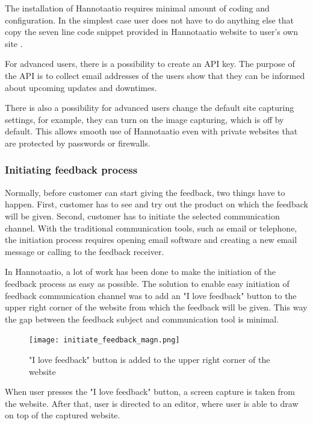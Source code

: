 \documentclass[english,12pt,a4paper,pdftex]{article}
\begin{document}
The installation of Hannotaatio requires minimal amount of coding and configuration. In the simplest case user does not have to do anything else that copy the seven line code snippet provided in Hannotaatio website to user's own site \citep{hannotaatio}.

For advanced users, there is a possibility to create an \ac{API} key. The purpose of the \ac{API} is to collect email addresses of the users show that they can be informed about upcoming updates and downtimes.

There is also a possibility for advanced users change the default site capturing settings, for example, they can turn on the image capturing, which is off by default. This allows smooth use of Hannotaatio even with private websites that are protected by passwords or firewalls.

\subsubsection{Initiating feedback process}

Normally, before customer can start giving the feedback, two things have to happen. First, customer has to see and try out the product on which the feedback will be given. Second, customer has to initiate the selected communication channel. With the traditional communication tools, such as email or telephone, the initiation process requires opening email software and creating a new email message or calling to the feedback receiver.

In Hannotaatio, a lot of work has been done to make the initiation of the feedback process as easy as possible. The solution to enable easy initiation of feedback communication channel was to add an "I love feedback" button to the upper right corner of the website from which the feedback will be given. This way the gap between the feedback subject and communication tool is minimal.

\begin{figure}[htb]
\begin{center}
\texttt{[image: initiate\_feedback\_magn.png]}
\end{center}
\caption{"I love feedback" button is added to the upper right corner of the website}
\end{figure}

When user presses the "I love feedback" button, a screen capture is taken from the website. After that, user is directed to an editor, where user is able to draw on top of the captured website.
\end{document}
